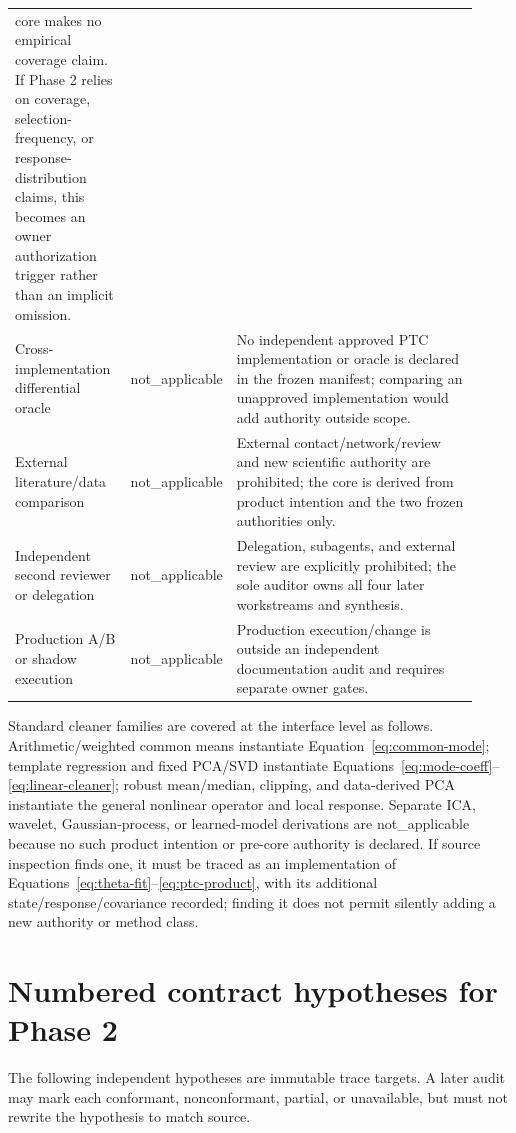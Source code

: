 \documentclass[11pt]{article}
\newcommand{\NA}{{\scriptsize\ttfamily not\_applicable}}
\begin{document}
\begin{longtable}{>{\raggedright\arraybackslash}p{0.25\linewidth}
                  >{\raggedright\arraybackslash}p{0.14\linewidth}
                  >{\raggedright\arraybackslash}p{0.53\linewidth}}
core makes no empirical coverage claim.  If Phase 2 relies on coverage,
selection-frequency, or response-distribution claims, this becomes an owner
authorization trigger rather than an implicit omission.\\
Cross-implementation differential oracle & \NA & No independent approved PTC
implementation or oracle is declared in the frozen manifest; comparing an
unapproved implementation would add authority outside scope.\\
External literature/data comparison & \NA & External contact/network/review
and new scientific authority are prohibited; the core is derived from product
intention and the two frozen authorities only.\\
Independent second reviewer or delegation & \NA & Delegation, subagents, and
external review are explicitly prohibited; the sole auditor owns all four
later workstreams and synthesis.\\
Production A/B or shadow execution & \NA & Production execution/change is
outside an independent documentation audit and requires separate owner gates.\\
\bottomrule
\end{longtable}

Standard cleaner families are covered at the interface level as follows.
Arithmetic/weighted common means instantiate Equation~\eqref{eq:common-mode};
template regression and fixed PCA/SVD instantiate
Equations~\eqref{eq:mode-coeff}--\eqref{eq:linear-cleaner}; robust mean/median,
clipping, and data-derived PCA instantiate the general nonlinear operator and
local response.  Separate ICA, wavelet, Gaussian-process, or learned-model
derivations are \NA{} because no such product intention or pre-core authority
is declared.  If source inspection finds one, it must be traced as an
implementation of Equations~\eqref{eq:theta-fit}--\eqref{eq:ptc-product}, with
its additional state/response/covariance recorded; finding it does not permit
silently adding a new authority or method class.

\section{Numbered contract hypotheses for Phase 2}
\label{sec:hypotheses}

The following independent hypotheses are immutable trace targets.  A later
audit may mark each conformant, nonconformant, partial, or unavailable, but
must not rewrite the hypothesis to match source.
\end{document}
